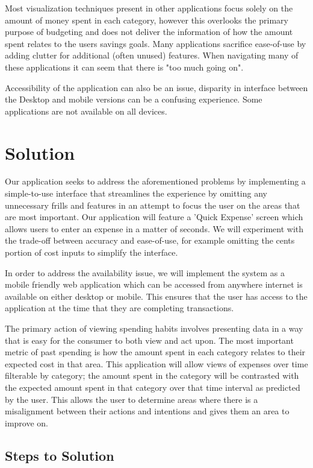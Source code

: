 \documentclass{chi2011}
\begin{document}
Most visualization techniques present in other applications focus solely on the amount of money spent in each category,
however this overlooks the primary purpose of budgeting and does not deliver the information of how the amount spent
relates to the users savings goals. Many applications sacrifice ease-of-use by adding clutter for additional (often
unused) features. When navigating many of these applications it can seem that there is "too much going on". 

Accessibility of the application can also be an issue, disparity in interface between the Desktop and mobile versions
can be a confusing experience. Some applications are not available on all devices.

\section{Solution}

Our application seeks to address the aforementioned problems by implementing a simple-to-use interface that streamlines
the experience by omitting any unnecessary frills and features in an attempt to focus the user on the areas that are
most important. Our application will feature a 'Quick Expense' screen which allows users to enter an expense in a
matter of seconds. We will experiment with the trade-off between accuracy and ease-of-use, for example omitting the
cents portion of cost inputs to simplify the interface.

In order to address the availability issue, we will implement the system as a mobile friendly web application which can
be accessed from anywhere internet is available on either desktop or mobile. This ensures that the user has access to
the application at the time that they are completing transactions.

The primary action of viewing spending habits involves presenting data in a way that is easy for the consumer to both
view and act upon. The most important metric of past spending is how the amount spent in each category relates to their
expected cost in that area. This application will allow views of expenses over time filterable by category; the amount
spent in the category will be contrasted with the expected amount spent in that category over that time interval as
predicted by the user. This allows the user to determine areas where there is a misalignment between their actions and
intentions and gives them an area to improve on.

\subsection{Steps to Solution}
\end{document}
